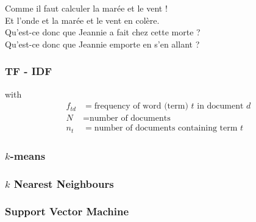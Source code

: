 \begin{frame}[t]
{   Comme il faut calculer la marée et le vent !\\
   Et l'onde et la marée et le vent en colère.\\[5mm]

   Qu'est-ce donc que Jeannie a fait chez cette morte ?\\
   Qu'est-ce donc que Jeannie emporte en s'en allant ?\\[5mm]

  }
\end{frame}

\begin{frame}
  \frametitle{TF - IDF}

  with
  \begin{align*}
    f_{td} &= \mbox{frequency of word (term) $t$ in document $d$} \\
    N &= \mbox{number of documents}\\
    n_t &= \mbox{number of documents containing term $t$}
  \end{align*}
\end{frame}

\begin{frame}
  \frametitle{$k$-means}
\end{frame}

\begin{frame}
  \frametitle{$k$ Nearest Neighbours}
\end{frame}

\begin{frame}
  \frametitle{Support Vector Machine}
\end{frame}

